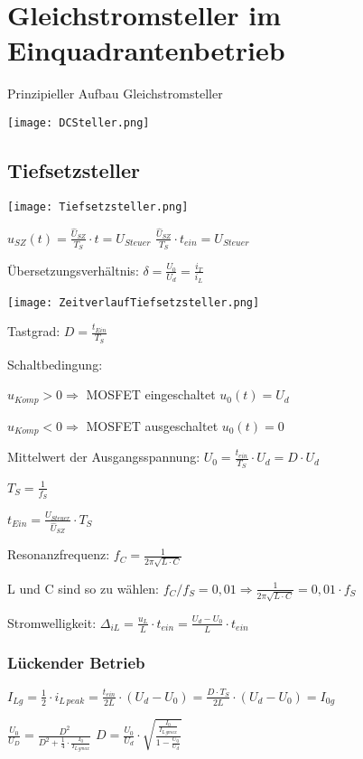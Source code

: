 \documentclass[german]{latex4ei/latex4ei_sheet}
\begin{document}
\section{Gleichstromsteller im Einquadrantenbetrieb}
	\begin{sectionbox}
		Prinzipieller Aufbau Gleichstromsteller

		\texttt{[image: DCSteller.png]}
		\subsection{Tiefsetzsteller}
			\begin{bluebox}
				\item \texttt{[image: Tiefsetzsteller.png]}
				\item $u_{SZ}(t) = \frac{\hat{U}_{SZ}}{T_S}\cdot t = U_{Steuer}$ \qquad $\frac{\hat{U}_{SZ}}{T_S}\cdot t_{ein} = U_{Steuer}$
				\item Übersetzungsverhältnis: $\delta = \frac{U_0}{U_d} = \frac{i_T}{i_L}$
				\item 
				\item \texttt{[image: ZeitverlaufTiefsetzsteller.png]}
				\item Tastgrad: $D = \frac{t_{Ein}}{T_S}$
				\item Schaltbedingung:
				\item $u_{Komp} > 0 \Rightarrow $ MOSFET eingeschaltet $u_0(t) = U_d$
				\item $u_{Komp} < 0 \Rightarrow $ MOSFET ausgeschaltet $ u_0(t) = 0$
				\item Mittelwert der Ausgangsspannung: $U_0 = \frac{t_{ein}}{T_S}\cdot U_d = D \cdot U_d$
				\item $T_S = \frac{1}{f_S}$
				\item $t_{Ein} = \frac{U_{Steuer}}{\hat{U}_{SZ}}\cdot T_S$
				\item Resonanzfrequenz: $f_C = \frac{1}{2\pi \sqrt{L\cdot C}}$
				\item L und C sind so zu wählen: $f_C/f_S = 0,01\Rightarrow \frac{1}{2\pi\sqrt{L\cdot C}} = 0,01\cdot f_S$
				\item Stromwelligkeit: $\Delta_{iL} = \frac{u_L}{L}\cdot t_{ein} = \frac{U_d-U_0}{L}\cdot t_{ein}$
			\end{bluebox}
			\subsubsection{Lückender Betrieb}
				\begin{bluebox}
					\item $I_{Lg} = \frac{1}{2}\cdot i_{L\,peak} = \frac{t_{ein}}{2L}\cdot (U_d-U_0) = \frac{D\cdot T_S}{2L}\cdot (U_d-U_0) = I_{0g}$
					\item $\frac{U_0}{U_D} = \frac{D^2}{D^2+\frac{1}{4}\cdot \frac{I_0}{I_{L\,gmax}}}$
					\qquad $D = \frac{U_0}{U_d}\cdot \sqrt{\frac{\frac{I_0}{I_{L\,gmax}}}{1-\frac{U_0}{U_d}}}$
				\end{bluebox}	
	\end{sectionbox}
\end{document}
